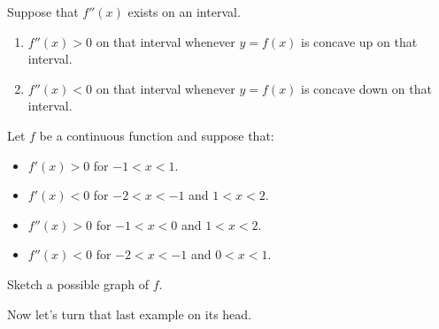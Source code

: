 \documentclass{ximera}
\begin{document}
\begin{theorem}
Suppose that $f''(x)$ exists on an interval.
\begin{enumerate}
\item $f''(x)>0$ on that interval whenever $y=f(x)$ is concave up on that interval.
\item $f''(x)<0$ on that interval whenever $y=f(x)$ is concave down on that interval.
\end{enumerate}
\end{theorem}


\begin{example}
  Let $f$ be a continuous function and suppose that:
  \begin{itemize}
  \item $f'(x) > 0$ for $-1< x<1$.
  \item $f'(x) < 0$ for $-2< x<-1$ and $1<x<2$.
  \item $f''(x) > 0$ for $-1<x<0$ and $1<x< 2$.
  \item $f''(x) < 0$ for $-2<x<-1$ and $0<x< 1$.  
  \end{itemize}
  Sketch a possible graph of $f$.
  \begin{image}
  \end{image}
  \begin{explanation}
  \end{explanation}
\end{example}

Now let's turn that last example on its head.
\end{document}
